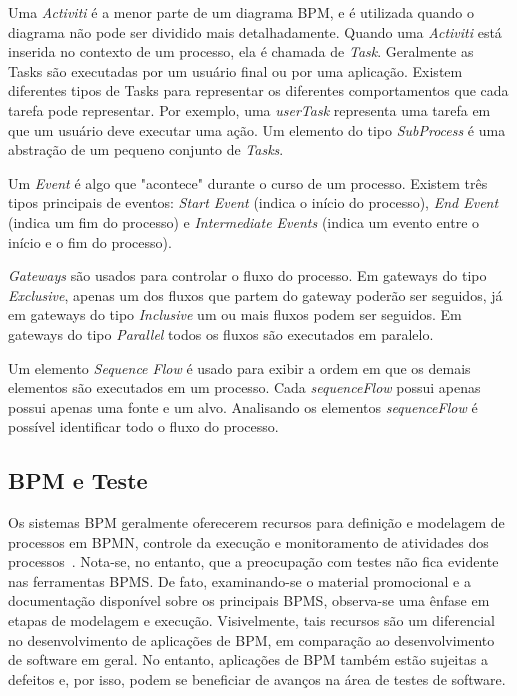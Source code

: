 \documentclass[12pt]{article}
\begin{document}
Uma \emph{Activiti} é a menor parte de um diagrama BPM, e é utilizada quando o diagrama não pode ser dividido mais detalhadamente. Quando uma \emph{Activiti} está inserida no contexto de um processo, ela é chamada de \emph{Task}. Geralmente as Tasks são executadas por um usuário final ou por uma aplicação. Existem diferentes tipos de Tasks para representar os diferentes comportamentos que cada tarefa pode representar. Por exemplo, uma \emph{userTask} representa uma tarefa em que um usuário deve executar uma ação. Um elemento do tipo \emph{SubProcess} é uma abstração de um pequeno conjunto de \emph{Tasks}.

Um \emph{Event} é algo que "acontece" durante o curso de um processo\cite{model2011notation}. Existem três tipos principais de eventos: \emph{Start Event} (indica o início do processo), \emph{End Event} (indica um fim do processo) e \emph{Intermediate Events} (indica um evento entre o início e o fim do processo).

\emph{Gateways} são usados para controlar o fluxo do processo. Em gateways do tipo \emph{Exclusive}, apenas um dos fluxos que partem do gateway poderão ser seguidos, já em gateways do tipo \emph{Inclusive} um ou mais fluxos podem ser seguidos. Em gateways do tipo \emph{Parallel} todos os fluxos são executados em paralelo.


Um elemento \emph{Sequence Flow} é usado para exibir a ordem em que os demais elementos são executados em um processo. Cada \emph{sequenceFlow} possui apenas possui apenas uma fonte e um alvo. Analisando os elementos \emph{sequenceFlow} é possível identificar todo o fluxo do processo.

\subsection{BPM e Teste}

Os sistemas BPM geralmente oferecerem recursos para definição e modelagem de processos em BPMN, controle da execução e monitoramento de atividades dos processos~\cite{forrester}. Nota-se, no entanto, que a preocupação com testes não fica evidente nas ferramentas BPMS. De fato, examinando-se o material promocional e a documentação disponível sobre os principais BPMS, observa-se uma ênfase em etapas de modelagem e execução. Visivelmente, tais recursos são um diferencial no desenvolvimento de aplicações de BPM, em comparação ao desenvolvimento de software em geral. No entanto, aplicações de BPM também estão sujeitas a defeitos e, por isso, podem se beneficiar de avanços na área de testes de software.
\end{document}
